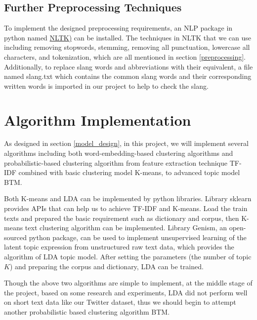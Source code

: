 \subsection{Further Preprocessing Techniques}

To implement the designed preprocessing requirements, an NLP package in python named \href{http://www.nltk.org/install.html}{NLTK)} can be installed. The techniques in NLTK that we can use including removing stopwords, stemming, removing all punctuation, lowercase all characters, and tokenization, which are all mentioned in section \ref{preprocessing}. Additionally, to replace slang words and abbreviations with their equivalent, a file named slang.txt which contains the common slang words and their corresponding written words is imported in our project to help to check the slang.

\section{Algorithm Implementation}
As designed in section \ref{model_design}, in this project, we will implement several algorithms including both word-embedding-based clustering algorithms and probabilistic-based clustering algorithm from feature extraction technique TF-IDF combined with basic clustering model K-means, to advanced topic model BTM. 

Both K-means and LDA can be implemented by python libraries. Library sklearn provides APIs that can help us to achieve TF-IDF and K-means. Load the train texts and prepared the basic requirement such as dictionary and corpus, then K-means text clustering algorithm can be implemented. Library Genism, an open-sourced python package, can be used to implement unsupervised learning of the latent topic expression from unstructured raw text data, which provides the algorithm of LDA topic model. After setting the parameters (the number of topic $K$) and preparing the corpus and dictionary, LDA can be trained.

Though the above two algorithms are simple to implement, at the middle stage of the project, based on some research and experiments, LDA did not perform well on short text data like our Twitter dataset, thus we should begin to attempt another probabilistic based clustering algorithm BTM. 

